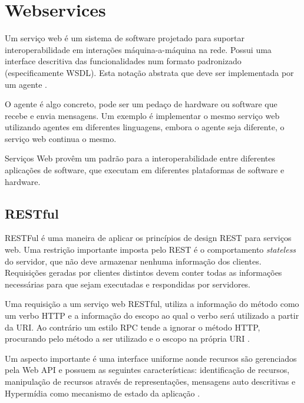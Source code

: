 
\section{Webservices}

Um servi\c{c}o web \'e um sistema de software projetado para suportar interoperabilidade em intera\c{c}\~oes m\'aquina-a-m\'aquina na rede. Possui uma interface descritiva das funcionalidades num formato padronizado (especificamente WSDL). Esta nota\c{c}\~ao abstrata que deve ser implementada por um agente \cite{w3c-web-04}.

O agente \'e algo concreto, pode ser um peda\c{c}o de hardware ou software que recebe e envia mensagens. Um exemplo \'e implementar o mesmo servi\c{c}o web utilizando agentes em diferentes linguagens, embora o agente seja diferente, o servi\c{c}o web continua o mesmo.

Servi\c{c}os Web prov\^em um padr\~ao para a interoperabilidade entre diferentes aplica\c{c}\~oes de software, que executam em diferentes plataformas de software e hardware.

\subsection{RESTful}

RESTFul \'e uma maneira de aplicar os princ\'ipios de design REST para servi\c{c}os web. Uma restri\c{c}\~ao importante imposta pelo REST \'e o comportamento \textit{stateless} do servidor, que n\~ao deve armazenar nenhuma informa\c{c}\~ao dos clientes. Requisi\c{c}\~oes geradas por clientes distintos devem conter todas as informa\c{c}\~oes necess\'arias para que sejam executadas e respondidas por servidores.

Uma requisi\c{c}\~ao a um servi\c{c}o web RESTful, utiliza a informa\c{c}\~ao do m\'etodo como um verbo HTTP e a informa\c{c}\~ao do escopo ao qual o verbo ser\'a utilizado a partir da URI. Ao contr\'ario um estilo RPC tende a ignorar o m\'etodo HTTP, procurando pelo m\'etodo a ser utilizado e o escopo na pr\'opria URI .

Um aspecto importante \'e uma interface uniforme aonde recursos s\~ao gerenciados pela Web API e possuem as seguintes caracter\'isticas: identifica\c{c}\~ao de recursos, manipula\c{c}\~ao de recursos atrav\'es de representa\c{c}\~oes, mensagens auto descritivas e Hyperm\'idia como mecanismo de estado da aplica\c{c}\~ao \cite{rest}.

